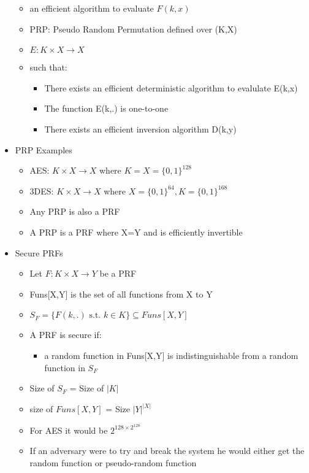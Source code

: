 \documentclass[]{article}
\begin{document}
\begin{itemize}
\begin{itemize}
        \item an efficient algorithm to evaluate $F(k,x)$
        \item PRP: Pseudo Random Permutation defined over (K,X)
        \item $E: K \times X \rightarrow X$
        \item such that:
        \begin{itemize}
            \item There exists an efficient deterministic algorithm to evalulate E(k,x)
            \item The function E(k,.) is one-to-one
            \item There exists an efficient inversion algorithm D(k,y)
        \end{itemize}
    \end{itemize}
    \item PRP Examples
    \begin{itemize}
        \item AES: $K \times X \rightarrow X$ where $K = X = \{0,1\}^{128}$
        \item 3DES: $K \times X \rightarrow X$ where $X=\{0,1\}^{64}, K = \{0,1\}^{168}$
        \item Any PRP is also a PRF
        \item A PRP is a PRF where X=Y and is efficiently invertible
    \end{itemize}
    \item Secure PRFs
    \begin{itemize}
        \item Let $F: K \times X \rightarrow Y$ be a PRF
        \item Funs[X,Y] is the set of all functions from X to Y
        \item $S_{F} = \{ F(k,.) \text{ s.t. } k \in K \} \subseteq Funs[X,Y]$
        \item A PRF is secure if:
        \begin{itemize}
            \item a random function in Funs[X,Y] is indistinguishable from a random function in $S_{F}$
        \end{itemize}
        \item Size of $S_{F}$ = Size of $| K |$
        \item size of $Funs[X,Y]$ = Size $| Y |^{| X |}$
        \item For AES it would be $2^{128 \times 2^{128}}$
        \item If an adversary were to try and break the system he would either get the random function or pseudo-random function

\end{itemize}
\end{itemize}
\end{document}
